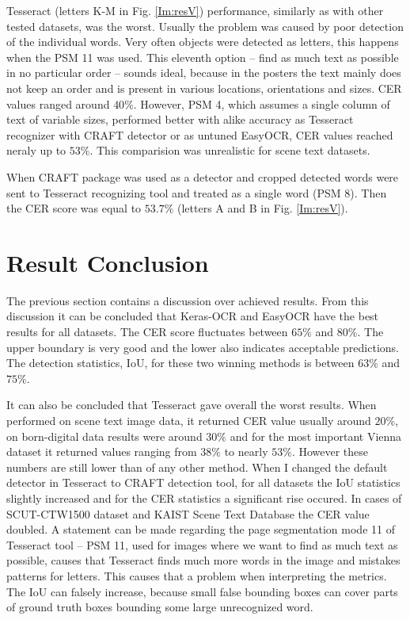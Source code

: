 Tesseract (letters K-M in Fig. \ref*{Im:resV}) performance, similarly as with other tested datasets, was the worst. Usually the problem was caused by poor detection of the individual words. Very often objects were detected as letters, this happens when the PSM 11 was used. This eleventh option --  find as much text as possible in no particular order -- sounds ideal, because in the posters the text mainly does not keep an order and is present in various locations, orientations and sizes. CER values ranged around $40\%$. However, PSM 4, which assumes a single column of text of variable sizes, performed better with alike accuracy as Tesseract recognizer with CRAFT detector or as untuned EasyOCR, CER values reached neraly up to $53\%$. This comparision was unrealistic for scene text datasets.

When CRAFT package was used as a detector and cropped detected words were sent to Tesseract recognizing tool and treated as a single word (PSM 8). Then the CER score was equal to $53.7\%$ (letters A and B in Fig. \ref*{Im:resV}).


\section*{Result Conclusion}

The previous section contains a discussion over achieved results. From this discussion it can be concluded that Keras-OCR and EasyOCR have the best results for all datasets. The CER score fluctuates between $65\%$ and $80\%$. The upper boundary is very good and the lower also indicates acceptable predictions. The detection statistics, IoU, for these two winning methods is between $63\%$ and $75\%$.

It can also be concluded that Tesseract gave overall the worst results. When performed on scene text image data, it returned CER value usually around $20\%$, on born-digital data results were around $30\%$ and for the most important Vienna dataset it returned values ranging from $38\%$ to nearly $53\%$. However these numbers are still lower than of any other method. When I changed the default detector in Tesseract to CRAFT detection tool, for all datasets the IoU statistics slightly increased and for the CER statistics a significant rise occured. In cases of SCUT-CTW1500 dataset and KAIST Scene Text Database the CER value doubled. A statement can be made regarding the page segmentation mode 11 of Tesseract tool -- PSM 11, used for images where we want to find as much text as possible, causes that Tesseract finds  much more words in the image and mistakes patterns for letters. This causes that a problem when interpreting the metrics. The IoU can falsely increase, because small false bounding boxes can cover parts of ground truth boxes bounding some large unrecognized word.

